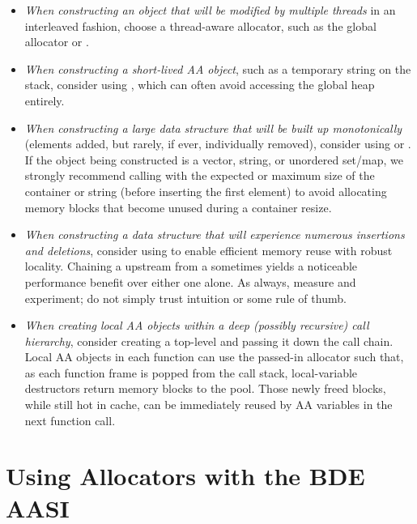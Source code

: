 \begin{itemize}
\item  \emph{When constructing an object that will be modified by multiple threads} in
an interleaved fashion, choose a thread-aware allocator, such as the
global allocator or .

\item \emph{When constructing a short-lived AA object}, such as a temporary string on
the stack, consider using , which can
often avoid accessing the global heap entirely.

\item \emph{When constructing a large data structure that will be built up
monotonically} (elements added, but rarely, if ever, individually removed),
consider using  or
. If the object being constructed is
a vector, string, or unordered set/map, we strongly recommend calling
 with the expected or maximum size of the container or string
(before inserting the first element) to avoid allocating memory blocks that
become unused during a container resize.

\item \emph{When constructing a data structure that will experience numerous
insertions and deletions}, consider using  to
enable efficient memory reuse with robust locality. Chaining a
 upstream from a
 sometimes yields a noticeable performance
benefit over either one alone. As always, measure and experiment; do not
simply trust intuition or some rule of thumb.

\item \emph{When creating local AA objects within a deep (possibly recursive) call
hierarchy}, consider creating a top-level  and
passing it down the call chain. Local AA objects in each function can use
the passed-in allocator such that, as each function frame is popped from
the call stack, local-variable destructors return memory blocks to the
pool. Those newly freed blocks, while still hot in cache, can be
immediately reused by AA variables in the next function call.

\end{itemize}

\section{Using Allocators with the BDE AASI}

